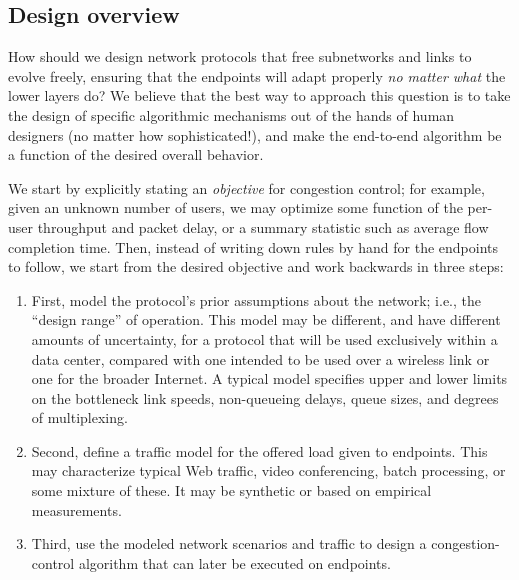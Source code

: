 \subsection*{Design overview}

How should we design network protocols that free subnetworks and links
to evolve freely, ensuring that the endpoints will adapt properly
\emph{no matter what} the lower layers do?  We believe that the best
way to approach this question is to take the design of specific
algorithmic mechanisms out of the hands of human designers (no matter
how sophisticated!), and make the end-to-end algorithm be a function
of the desired overall behavior.


We start by explicitly stating an {\em objective} for congestion
control; for example, given an unknown number of users, we may
optimize some function of the per-user throughput and packet delay, or
a summary statistic such as average flow completion time. Then,
instead of writing down rules by hand for the endpoints to follow, we
start from the desired objective and work backwards in three steps:



\begin{enumerate}

\item First, model the protocol's prior assumptions about the network;
  i.e., the ``design range'' of operation. This model
  may be different, and have different amounts of uncertainty, for a
  protocol that will be used exclusively within a data center,
  compared with one intended to be used over a wireless link or one
  for the broader Internet. A typical model specifies upper and lower
  limits on the bottleneck link speeds, non-queueing delays, queue
  sizes, and degrees of multiplexing.

\item Second, define a traffic model for the offered load given to
  endpoints. This may characterize typical Web traffic, video
  conferencing, batch processing, or some mixture of these. It may
  be synthetic or based on empirical measurements.

\item Third, use the modeled network scenarios and traffic to design a
  congestion-control algorithm that can later be executed on endpoints.

\end{enumerate}

